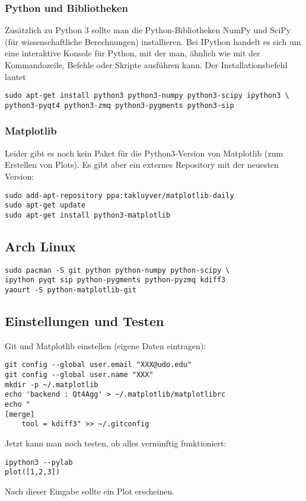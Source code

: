 \subsubsection{Python und Bibliotheken}
Zusätzlich zu Python 3 sollte man die Python-Bibliotheken NumPy und SciPy (für wissenschaftliche Berechnungen) installieren.
Bei IPython handelt es sich um eine interaktive Konsole für Python, mit der man, ähnlich wie mit der Kommandozeile, Befehle oder Skripte ausführen kann.
Der Installationsbefehl lautet
\begin{verbatim}
sudo apt-get install python3 python3-numpy python3-scipy ipython3 \
python3-pyqt4 python3-zmq python3-pygments python3-sip
\end{verbatim}

\subsubsection{Matplotlib}
Leider gibt es noch kein Paket für die Python3-Version von Matplotlib (zum Erstellen von Plots).
Es gibt aber ein externes Repository mit der neuesten Version:
\begin{verbatim}
sudo add-apt-repository ppa:takluyver/matplotlib-daily
sudo apt-get update
sudo apt-get install python3-matplotlib
\end{verbatim}

\subsection{Arch Linux}
\begin{verbatim}
sudo pacman -S git python python-numpy python-scipy \
ipython pyqt sip python-pygments python-pyzmq kdiff3
yaourt -S python-matplotlib-git
\end{verbatim}

\subsection{Einstellungen und Testen}
\label{install-test}
Git und Matplotlib einstellen (eigene Daten eintragen):
\begin{verbatim}
git config --global user.email "XXX@udo.edu"
git config --global user.name "XXX"
mkdir -p ~/.matplotlib
echo 'backend : Qt4Agg' > ~/.matplotlib/matplotlibrc
echo "
[merge]
    tool = kdiff3" >> ~/.gitconfig
\end{verbatim}
Jetzt kann man noch testen, ob alles vernünftig funktioniert:
\begin{verbatim}
ipython3 --pylab
plot([1,2,3])
\end{verbatim}
Nach dieser Eingabe sollte ein Plot erscheinen.
